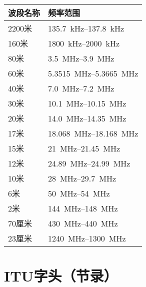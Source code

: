 \begin{longtable}{|l|l|}
  \hline
  \textbf{波段名称} & \textbf{频率范围}                                    \\
  \hline
  2200米         & \qtyrange[range-phrase=--]{135.7}{137.8}{\kHz}   \\
  \hline
  160米          & \qtyrange[range-phrase=--]{1800}{2000}{\kHz}     \\
  \hline
  80米           & \qtyrange[range-phrase=--]{3.5}{3.9}{\MHz}       \\
  \hline
  60米           & \qtyrange[range-phrase=--]{5.3515}{5.3665}{\MHz} \\
  \hline
  40米           & \qtyrange[range-phrase=--]{7.0}{7.2}{\MHz}       \\
  \hline
  30米           & \qtyrange[range-phrase=--]{10.1}{10.15}{\MHz}    \\
  \hline
  20米           & \qtyrange[range-phrase=--]{14.0}{14.35}{\MHz}    \\
  \hline
  17米           & \qtyrange[range-phrase=--]{18.068}{18.168}{\MHz} \\
  \hline
  15米           & \qtyrange[range-phrase=--]{21}{21.45}{\MHz}      \\
  \hline
  12米           & \qtyrange[range-phrase=--]{24.89}{24.99}{\MHz}   \\
  \hline
  10米           & \qtyrange[range-phrase=--]{28}{29.7}{\MHz}       \\
  \hline
  6米            & \qtyrange[range-phrase=--]{50}{54}{\MHz}         \\
  \hline
  2米            & \qtyrange[range-phrase=--]{144}{148}{\MHz}       \\
  \hline
  70厘米          & \qtyrange[range-phrase=--]{430}{440}{\MHz}       \\
  \hline
  23厘米          & \qtyrange[range-phrase=--]{1240}{1300}{\MHz}     \\
  \hline
\end{longtable}

\newpage

\section{ITU字头（节录）}

